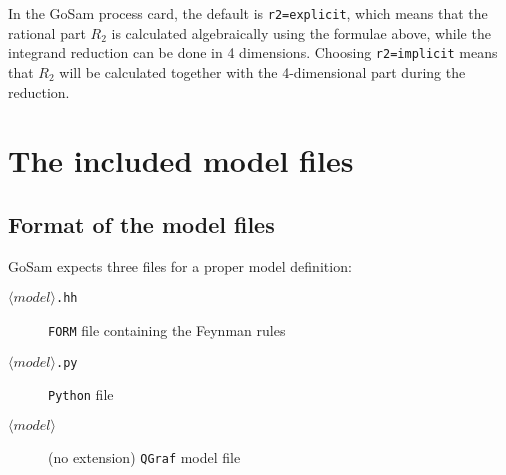 \documentclass[11pt,a4paper]{refrep}
\newcommand{\gosamversion}{{3{.}0}}
\newcommand{\gosam}{{\sc GoSam}\xspace}
\newcommand{\gosamv}[1][\gosamversion]{{\sc GoSam}\xspace}
\newcommand{\qgraf}{{\tt QGraf}\xspace}
\newcommand{\form}{{\tt FORM}\xspace}
\newcommand{\python}{{\tt Python}\xspace}
\begin{document}
In the \gosam{} process card, the default is {\tt r2=explicit}, which means that 
the rational part $R_2$ is calculated algebraically using the formulae above, 
while the integrand reduction can be done in 4 dimensions.
Choosing {\tt r2=implicit} means that $R_2$ will be calculated together with the 4-dimensional 
part during the reduction.

\chapter{The included model files}
\label{chp:model-files}



\section{Format of the model files}\label{sec:modelfiles}
\gosamv{} expects three files for a proper model definition:
\begin{description}
\item[$\langle model\rangle$\texttt{.hh}] \form{} file containing the Feynman rules
\item[$\langle model\rangle$\texttt{.py}] \python{} file
\item[$\langle model\rangle$] (no extension) \qgraf{} model file
\end{description}
\end{document}
